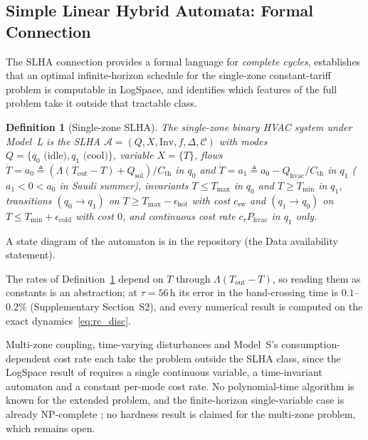 \documentclass[pdflatex,sn-mathphys-num,iicol]{sn-jnl}
\theoremstyle{thmstyleone}\newtheorem{proposition}{Proposition}\newtheorem{corollary}{Corollary}
\theoremstyle{thmstyletwo}\newtheorem{remark}{Remark}\newtheorem{observation}{Observation}
\theoremstyle{thmstylethree}\newtheorem{definition}{Definition}
\newcommand{\Tmin}{T_{\min}}
\newcommand{\Tmax}{T_{\max}}
\newcommand{\Tout}{T_{\mathrm{out}}}
\newcommand{\Cth}{C_{\mathrm{th}}}
\newcommand{\Qhvac}{Q_{\mathrm{hvac}}}
\newcommand{\csw}{c_{\mathrm{sw}}}
\newcommand{\Phvac}{P_{\mathrm{hvac}}}
\begin{document}
\subsection{Simple Linear Hybrid Automata: Formal Connection}
\label{subsec:slha}
 
The SLHA connection \citep{Mousa2016} provides a formal language for \emph{complete cycles}, establishes that an optimal infinite-horizon schedule for the single-zone constant-tariff problem is computable in LogSpace, and identifies which features of the full problem take it outside that tractable class.
 
\begin{definition}[Single-zone SLHA]
\label{def:slha}
The single-zone binary HVAC system under Model~L is the SLHA $\mathcal{A}=(Q,X,\mathrm{Inv},f,\Delta,\mathcal{C})$ with modes $Q=\{q_0\text{ (idle)},q_1\text{ (cool)}\}$, variable $X=\{T\}$, flows $\dot{T}{=}a_0\triangleq(\Lambda(\Tout-T)+Q_{\mathrm{sol}})/\Cth$ in $q_0$ and $\dot{T}{=}a_1\triangleq a_0-\Qhvac/\Cth$ in $q_1$ ($a_1<0<a_0$ in Saudi summer), invariants $T\!\le\!\Tmax$ in $q_0$ and $T\!\ge\!\Tmin$ in $q_1$, transitions $(q_0\!\to\!q_1)$ on $T\!\ge\!\Tmax\!-\!\epsilon_{\mathrm{hot}}$ with cost $\csw$ and $(q_1\!\to\!q_0)$ on $T\!\le\!\Tmin\!+\!\epsilon_{\mathrm{cold}}$ with cost $0$, and continuous cost rate $c_r\Phvac$ in $q_1$ only.
\end{definition}
 
A state diagram of the automaton is in the repository (the Data availability statement).

The rates of Definition~\ref{def:slha} depend on $T$ through $\Lambda(\Tout-T)$, so reading them as constants is an abstraction; at $\tau=56\,$h its error in the band-crossing time is $0.1$--$0.2\%$ (Supplementary Section~S2), and every numerical result is computed on the exact dynamics~\eqref{eq:rc_disc}.

Multi-zone coupling, time-varying disturbances and Model~S's consumption-dependent cost rate each take the problem outside the SLHA class, since the LogSpace result of \citep{Mousa2016} requires a single continuous variable, a time-invariant automaton and a constant per-mode cost rate. No polynomial-time algorithm is known for the extended problem, and the finite-horizon single-variable case is already NP-complete \citep{Mousa2016}; no hardness result is claimed for the multi-zone problem, which remains open.
 
\end{document}

